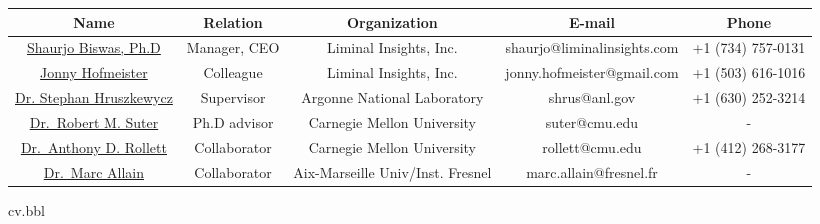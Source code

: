 \documentclass[10pt]{article}
\newcommand{\bibsubimport}[2]{{#2}}
\begin{document}
\begin{center}
    \begin{tabular}{ |c|c|c|c|c| }
        \hline
        \textbf{Name} & \textbf{Relation} & \textbf{Organization} & \textbf{E-mail} & \textbf{Phone} \\ \hline
        \href{https://www.linkedin.com/in/shaurjobiswas/}{Shaurjo Biswas, Ph.D} & Manager, CEO & Liminal Insights, Inc. & shaurjo@liminalinsights.com & +1 (734) 757-0131 \\ \hline
        \href{https://linkedin.com/in/jonny-hofmeister-24852694}{Jonny Hofmeister} & Colleague & Liminal Insights, Inc. & jonny.hofmeister@gmail.com & +1 (503) 616-1016 \\ \hline
        \href{https://www.anl.gov/profile/stephan-o-hruszkewycz}{Dr. Stephan Hruszkewycz} & Supervisor & Argonne National Laboratory & shrus@anl.gov & +1 (630) 252-3214 \\ \hline
        \href{https://www.cmu.edu/physics/people/faculty/suter.html}{Dr.~Robert M. Suter} & Ph.D advisor & Carnegie Mellon University & suter@cmu.edu & - \\ \hline
        \href{https://www.cmu.edu/engineering/materials/people/faculty/bios/rollett-up-7jan21.html}{Dr.~Anthony D. Rollett} & Collaborator & Carnegie Mellon University & rollett@cmu.edu & +1 (412) 268-3177 \\ \hline
        \href{https://www.researchgate.net/profile/Marc-Allain}{Dr.~Marc Allain} & Collaborator & Aix-Marseille Univ/Inst. Fresnel & marc.allain@fresnel.fr & - \\ \hline
    \end{tabular}
\end{center}
   

\bibsubimport{./}{cv.bbl}
\end{document}
